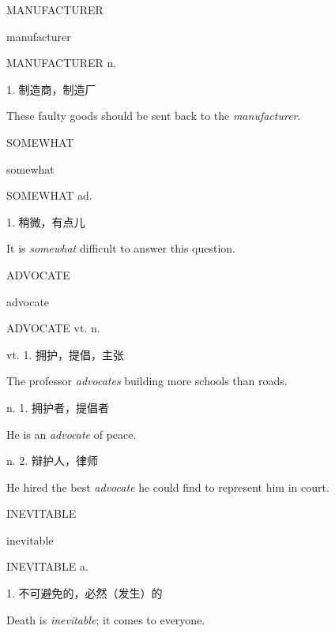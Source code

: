 \begin{flashcard}{
MANUFACTURER

manufacturer
}
\begin{center}
MANUFACTURER n. 
\end{center}
1. 制造商，制造厂

These faulty goods should be sent back to the \textit{manufacturer}.

\end{flashcard}
\begin{flashcard}{
SOMEWHAT

somewhat
}
\begin{center}
SOMEWHAT ad. 
\end{center}
1. 稍微，有点儿

It is \textit{somewhat} difficult to answer this question.

\end{flashcard}
\begin{flashcard}{
ADVOCATE

advocate
}
\begin{center}
ADVOCATE vt.  n. 
\end{center}
vt. 1. 拥护，提倡，主张

The professor \textit{advocates} building more schools than roads.

n. 1. 拥护者，提倡者

He is an \textit{advocate} of peace.

n. 2. 辩护人，律师

He hired the best \textit{advocate} he could find to represent him in court.

\end{flashcard}
\begin{flashcard}{
INEVITABLE

inevitable
}
\begin{center}
INEVITABLE a. 
\end{center}
1. 不可避免的，必然（发生）的

Death is \textit{inevitable}; it comes to everyone.

\end{flashcard}
